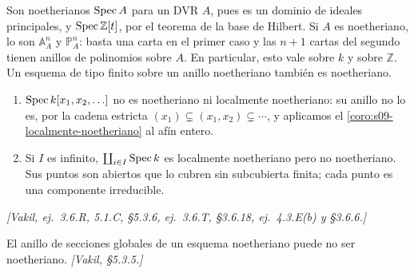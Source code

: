 \begin{ejem}
\label{ejem:s09-noetherianos}
Son noetherianos $\operatorname{Spec} A$ para un DVR $A$, pues es un dominio de ideales principales, y $\operatorname{Spec}\mathbb Z[t]$, por el teorema de la base de Hilbert. Si $A$ es noetheriano, lo son $\mathbb A^n_A$ y $\mathbb P^n_A$: basta una carta en el primer caso y las $n+1$ cartas del segundo tienen anillos de polinomios sobre $A$. En particular, esto vale sobre $k$ y sobre $\mathbb Z$. Un esquema de tipo finito sobre un anillo noetheriano también es noetheriano.
\begin{enumerate}[label=(\alph*)]
\item $\operatorname{Spec} k[x_1,x_2,\ldots]$ no es noetheriano ni localmente noetheriano: su anillo no lo es, por la cadena estricta $(x_1)\subsetneq(x_1,x_2)\subsetneq\cdots$, y aplicamos el \cref{coro:s09-localmente-noetheriano} al afín entero.
\item Si $I$ es infinito, $\coprod_{i\in I}\operatorname{Spec} k$ es localmente noetheriano pero no noetheriano. Sus puntos son abiertos que lo cubren sin subcubierta finita; cada punto es una componente irreducible.
\end{enumerate}
\emph{[Vakil, ej.~3.6.R, 5.1.C, \S5.3.6, ej.~3.6.T, \S3.6.18, ej.~4.3.E(b) y \S3.6.6.]}
\end{ejem}

\begin{obs}
\label{obs:s09-secciones-globales-noetherianas}
El anillo de secciones globales de un esquema noetheriano puede no ser noetheriano. \emph{[Vakil, \S5.3.5.]}
\end{obs}

